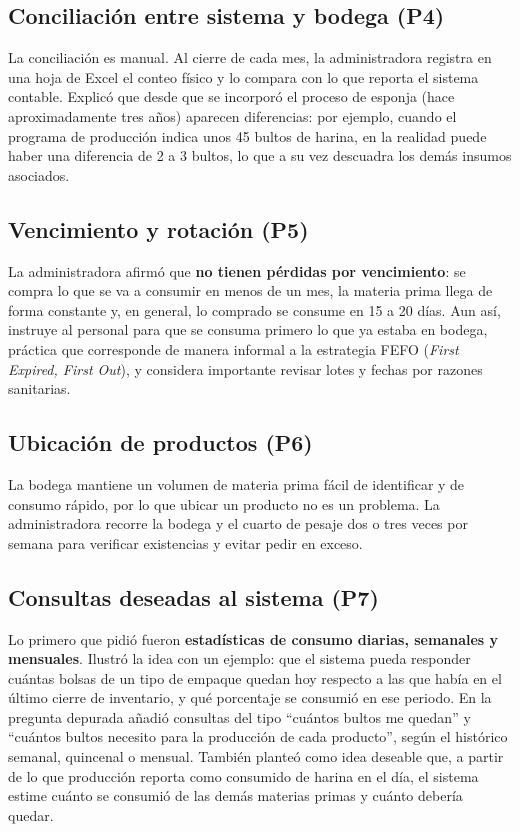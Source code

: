 \subsection{Conciliación entre sistema y bodega (P4)}

La conciliación es manual. Al cierre de cada mes, la administradora registra en una hoja de Excel el conteo físico y lo compara con lo que reporta el sistema contable. Explicó que desde que se incorporó el proceso de esponja (hace aproximadamente tres años) aparecen diferencias: por ejemplo, cuando el programa de producción indica unos 45 bultos de harina, en la realidad puede haber una diferencia de 2 a 3 bultos, lo que a su vez descuadra los demás insumos asociados.

\subsection{Vencimiento y rotación (P5)}

La administradora afirmó que \textbf{no tienen pérdidas por vencimiento}: se compra lo que se va a consumir en menos de un mes, la materia prima llega de forma constante y, en general, lo comprado se consume en 15 a 20 días. Aun así, instruye al personal para que se consuma primero lo que ya estaba en bodega, práctica que corresponde de manera informal a la estrategia FEFO (\textit{First Expired, First Out}), y considera importante revisar lotes y fechas por razones sanitarias.

\subsection{Ubicación de productos (P6)}

La bodega mantiene un volumen de materia prima fácil de identificar y de consumo rápido, por lo que ubicar un producto no es un problema. La administradora recorre la bodega y el cuarto de pesaje dos o tres veces por semana para verificar existencias y evitar pedir en exceso.

\subsection{Consultas deseadas al sistema (P7)}

Lo primero que pidió fueron \textbf{estadísticas de consumo diarias, semanales y mensuales}. Ilustró la idea con un ejemplo: que el sistema pueda responder cuántas bolsas de un tipo de empaque quedan hoy respecto a las que había en el último cierre de inventario, y qué porcentaje se consumió en ese periodo. En la pregunta depurada añadió consultas del tipo ``cuántos bultos me quedan'' y ``cuántos bultos necesito para la producción de cada producto'', según el histórico semanal, quincenal o mensual. También planteó como idea deseable que, a partir de lo que producción reporta como consumido de harina en el día, el sistema estime cuánto se consumió de las demás materias primas y cuánto debería quedar.

